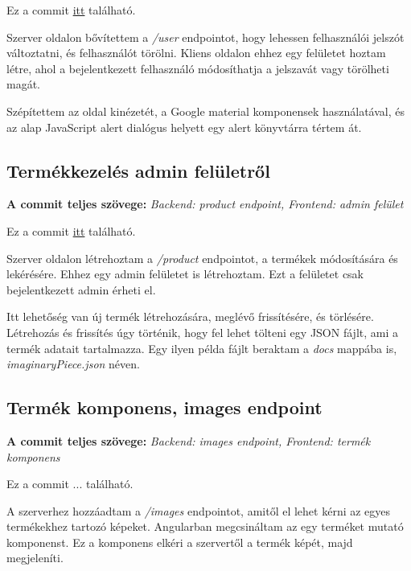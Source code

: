 \documentclass[]{article}
\begin{document}
\bigskip
\noindent
Ez a commit \href{https://github.com/Gtomika/prf-project/commit/6794668ee38e4793fa249915b7df71481f39e519}{itt} található.
\bigskip

Szerver oldalon bővítettem a \textit{/user} endpointot, hogy lehessen felhasználói jelszót változtatni, és felhasználót törölni. Kliens oldalon ehhez egy felületet hoztam létre, ahol a bejelentkezett felhasználó módosíthatja a jelszavát vagy törölheti magát.

Szépítettem az oldal kinézetét, a Google material komponensek használatával, és az alap JavaScript alert dialógus helyett egy alert könyvtárra tértem át.

\subsection{Termékkezelés admin felületről}

\noindent
\textbf{A commit teljes szövege:} \textit{ Backend: product endpoint, Frontend: admin felület}

\bigskip
\noindent
Ez a commit \href{https://github.com/Gtomika/prf-project/commit/f592c43be14ac39f53c4aa99b7b46c60c5b0640c}{itt} található.
\bigskip

Szerver oldalon létrehoztam a \textit{/product} endpointot, a termékek módosítására és lekérésére. Ehhez egy admin felületet is létrehoztam. Ezt a felületet csak bejelentkezett admin érheti el. 

Itt lehetőség van új termék létrehozására, meglévő frissítésére, és törlésére. Létrehozás és frissítés úgy történik, hogy fel lehet tölteni egy JSON fájlt, ami a termék adatait tartalmazza. Egy ilyen példa fájlt beraktam a \textit{docs} mappába is, \textit{imaginaryPiece.json} néven.

\subsection{Termék komponens, images endpoint}

\noindent
\textbf{A commit teljes szövege:} \textit{ Backend: images endpoint, Frontend: termék komponens}

\bigskip
\noindent
Ez a commit ... található.
\bigskip

A szerverhez hozzáadtam a \textit{/images} endpointot, amitől el lehet kérni az egyes termékekhez tartozó képeket. Angularban megcsináltam az egy terméket mutató komponenst. Ez a komponens elkéri a szervertől a termék képét, majd megjeleníti.
\end{document}
